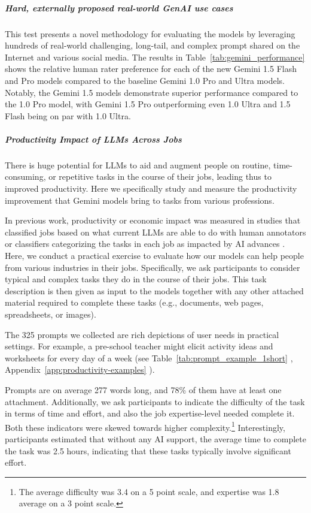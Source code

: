 \subparagraph{Hard, externally proposed real-world GenAI use cases}

This test presents a novel methodology for evaluating the models by leveraging hundreds of real-world challenging, long-tail, and complex prompt shared on the Internet and various social media.  The results in Table~\ref{tab:gemini_performance}  shows the relative human rater preference for each of the new Gemini 1.5 Flash and Pro models compared to the baseline Gemini 1.0 Pro and Ultra models. Notably, the Gemini 1.5 models demonstrate superior performance compared to the 1.0 Pro model, with Gemini 1.5 Pro outperforming even 1.0 Ultra and  1.5 Flash being on par with 1.0 Ultra. 

\subparagraph{Productivity Impact of LLMs Across Jobs}
\label{sec:productivity}

There is huge potential for LLMs to aid and augment people on routine, time-consuming, or repetitive tasks in the course of their jobs, leading thus to improved productivity. Here we specifically study and measure the productivity improvement that  Gemini models bring to tasks from various professions. 

In previous work, productivity or economic impact was measured in studies that classified jobs based on what current LLMs are able to do with human annotators or  classifiers categorizing the tasks in each job as impacted by AI advances \cite{felten2018method, eloundou2023gpts,jobs-white-paper}.  Here, we conduct a practical exercise to evaluate how our models can help people from various industries in their jobs. Specifically, we ask participants to consider typical and complex tasks they do in the course of their jobs. This task  description is then given as input to the models together with any other attached material required to complete these tasks (e.g., documents, web pages, spreadsheets, or images).

The 325 prompts we collected are rich depictions of user needs in practical settings. For example, a pre-school teacher might elicit activity ideas and worksheets for every day of a week (see Table~\ref{tab:prompt_example_1short}
, Appendix~\ref{app:productivity-examples}
).

Prompts are on average 277 words long, and 78\% of them have at least one attachment. Additionally, we ask participants to indicate the difficulty of the task in terms of time and effort, and also the job expertise-level needed complete it. Both these indicators were skewed towards higher complexity.\footnote{The average difficulty was 3.4 on a 5 point scale, and expertise was 1.8 average on a 3 point scale.} Interestingly, participants estimated that without any AI support, the average time to complete the task was 2.5 hours, indicating that these tasks typically involve significant effort.


